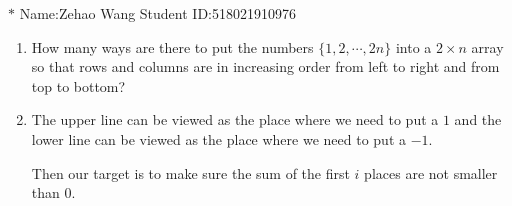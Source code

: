 \documentclass[12pt,a4paper]{article}
\makeatletter
\newtheorem*{solution}{Solution}
\theoremstyle{definition}
\renewenvironment{solution}[1][Solution] {\par\pushQED{\qed}\normalfont\topsep6\p@\@plus6\p@\relax\trivlist\item[\hskip\labelsep\bfseries#1\@addpunct{.}]\ignorespaces}{\popQED\endtrivlist\@endpefalse} \makeatother
\makeatother
\begin{document}
\noindent

\noindent{}
\begin{center}
\footnotesize{\color{blue}$*$ Name:Zehao Wang  \quad Student ID:518021910976}
\end{center}

\begin{enumerate}
    \item 
        How many ways are there to put the numbers $\{1,2,\cdots,2n\}$ into a $2 \times n$ array so that rows and columns are in increasing order from left to right and from top to bottom?
        \begin{solution}
        	The upper line can be viewed as the place where we need to put a $1$ and the lower line can be viewed as the place where we need to put a $-1$.
        	
        	Then our target is to make sure the sum of the first $i$ places are not smaller than $0$.
        	

\end{solution}
\end{enumerate}
\end{document}
